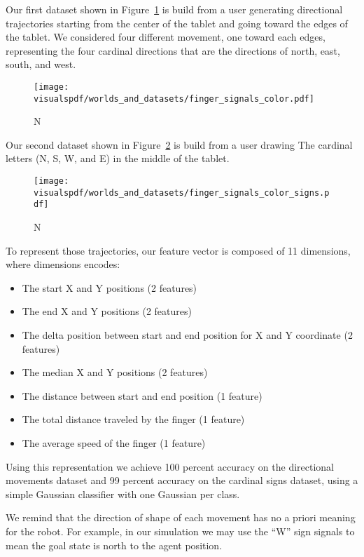 Our first dataset shown in Figure~\ref{fig:fingerdatasetdirection} is build from a user generating directional trajectories starting from the center of the tablet and going toward the edges of the tablet. We considered four different movement, one toward each edges, representing the four cardinal directions that are the directions of north, east, south, and west. 

\begin{figure}[!htbp]
\centering
\texttt{[image: \\visualspdf/worlds\_and\_datasets/finger\_signals\_color.pdf]}
\caption{N}
\label{fig:fingerdatasetdirection}
\end{figure} 

Our second dataset shown in Figure~\ref{fig:fingerdatasetsigns} is build from a user drawing The cardinal letters (N, S, W, and E) in the middle of the tablet.

\begin{figure}[!htbp]
\centering
\texttt{[image: \\visualspdf/worlds\_and\_datasets/finger\_signals\_color\_signs.pdf]}
\caption{N}
\label{fig:fingerdatasetsigns}
\end{figure} 

To represent those trajectories, our feature vector is composed of 11 dimensions, where dimensions encodes:
\begin{itemize}
   \item The start X and Y positions (2 features)
   \item The end X and Y positions (2 features)
   \item The delta position between start and end position for X and Y coordinate (2 features)
   \item The median X and Y positions (2 features)
   \item The distance between start and end position (1 feature)
   \item The total distance traveled by the finger (1 feature)
   \item The average speed of the finger (1 feature)
\end{itemize}

Using this representation we achieve 100 percent accuracy on the directional movements dataset and 99 percent accuracy on the cardinal signs dataset, using a simple Gaussian classifier with one Gaussian per class.

We remind that the direction of shape of each movement has no a priori meaning for the robot. For example, in our simulation we may use the ``W'' sign signals to mean the goal state is north to the agent position.


